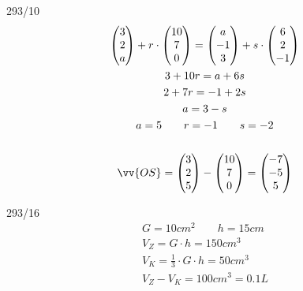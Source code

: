 \begin{exercise}{293/10}
\begin{gather*}
    \begin{pmatrix}3 \\ 2 \\ a\end{pmatrix} + r \cdot \begin{pmatrix}10 \\ 7 \\ 0\end{pmatrix} = \begin{pmatrix}a \\ -1 \\ 3\end{pmatrix} + s \cdot \begin{pmatrix}6 \\ 2 \\ -1\end{pmatrix} \\
    3 + 10r = a + 6s \\
    2 + 7r = -1 + 2s \\
    a = 3 - s \\
    a = 5 \qquad r = -1 \qquad s = -2 \\\\
    \vv{OS} = \begin{pmatrix}3 \\ 2 \\ 5\end{pmatrix} - \begin{pmatrix}10 \\ 7 \\ 0\end{pmatrix} = \begin{pmatrix}-7 \\ -5 \\ 5\end{pmatrix}
  \end{gather*}
\end{exercise}
\begin{exercise}{293/16}
  \begin{gather*}
    G = 10cm^2 \qquad h = 15cm \\
    V_Z = G \cdot h = 150cm^3 \\
    V_K = \frac{1}{3} \cdot G \cdot h = 50cm^3 \\
    V_Z - V_K = 100cm^3 = 0.1L
  \end{gather*}
\end{exercise}
